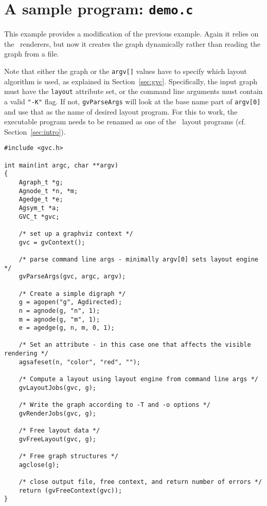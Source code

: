 \section{A sample program: {\tt demo.c}}
\label{sec:demo}
This example provides a modification of the previous example. Again it
relies on the \gviz\ renderers, but now it creates the graph dynamically
rather than reading the graph from a file.   

Note that either the graph or the {\tt argv[]} values have to specify which
layout algorithm is used, as explained in Section~\ref{sec:gvc}. Specifically,
the input graph must have the {\tt layout} attribute set, or the command line
arguments must contain a valid {\tt "-K"} flag.
If not, {\tt gvParseArgs} will look at the base name part of {\tt argv[0]} and
use that as the name of desired layout program. For this to work, the executable
program needs to be renamed as one of the \gviz\ layout programs (cf. Section~\ref{sec:intro}).
\begin{verbatim}
#include <gvc.h>

int main(int argc, char **argv)
{
    Agraph_t *g;
    Agnode_t *n, *m;
    Agedge_t *e;
    Agsym_t *a;
    GVC_t *gvc;

    /* set up a graphviz context */
    gvc = gvContext();

    /* parse command line args - minimally argv[0] sets layout engine */
    gvParseArgs(gvc, argc, argv);

    /* Create a simple digraph */
    g = agopen("g", Agdirected);
    n = agnode(g, "n", 1);
    m = agnode(g, "m", 1);
    e = agedge(g, n, m, 0, 1);

    /* Set an attribute - in this case one that affects the visible rendering */
    agsafeset(n, "color", "red", "");

    /* Compute a layout using layout engine from command line args */
    gvLayoutJobs(gvc, g);

    /* Write the graph according to -T and -o options */
    gvRenderJobs(gvc, g);

    /* Free layout data */
    gvFreeLayout(gvc, g);

    /* Free graph structures */
    agclose(g);

    /* close output file, free context, and return number of errors */
    return (gvFreeContext(gvc));
}
\end{verbatim}
